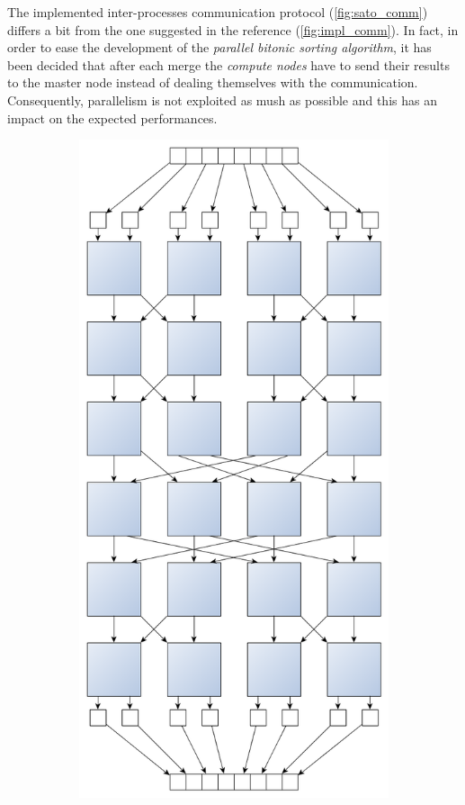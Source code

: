 \documentclass[a4paper,11pt]{article}
\begin{document}
  The implemented inter-processes communication protocol (\ref{fig:sato_comm}) differs a bit from the one suggested in the reference (\ref{fig:impl_comm}). In fact, in order to ease the development of the \textit{parallel bitonic sorting algorithm}, it has been decided that after each merge the \textit{compute nodes} have to send their results to the master node instead of dealing themselves with the communication. Consequently, parallelism is not exploited as mush as possible and this has an impact on the expected performances.
  \begin{figure}[h!]
    \centering
    \begin{subfigure}[b]{0.4\textwidth}
        \centering
        \includegraphics[scale=0.15]{img/bitonic_sort_8_sota.png}

\end{subfigure}
\end{figure}
\end{document}
